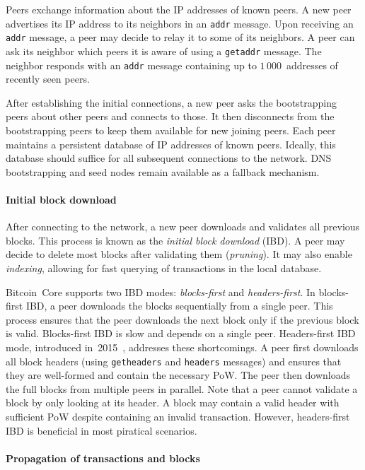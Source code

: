 Peers exchange information about the IP addresses of known peers.
A new peer advertises its IP address to its neighbors in an \texttt{addr} message.
Upon receiving an \texttt{addr} message, a peer may decide to relay it to some of its neighbors.
A peer can ask its neighbor which peers it is aware of using a \texttt{getaddr} message.
The neighbor responds with an \texttt{addr} message containing up to $1\,000$~addresses of recently seen peers.

After establishing the initial connections, a new peer asks the bootstrapping peers about other peers and connects to those.
It then disconnects from the bootstrapping peers to keep them available for new joining peers.
Each peer maintains a persistent database of IP addresses of known peers.
Ideally, this database should suffice for all subsequent connections to the network.
DNS bootstrapping and seed nodes remain available as a fallback mechanism.


\paragraph{Initial block download}

After connecting to the network, a new peer downloads and validates all previous blocks.
This process is known as the \textit{initial block download} (IBD).
A peer may decide to delete most blocks after validating them (\textit{pruning}).
It may also enable \textit{indexing}, allowing for fast querying of transactions in the local database.

Bitcoin~Core supports two IBD modes: \textit{blocks-first} and \textit{headers-first}.
In blocks-first IBD, a peer downloads the blocks sequentially from a single peer.
This process ensures that the peer downloads the next block only if the previous block is valid.
Blocks-first IBD is slow and depends on a single peer.
Headers-first IBD mode, introduced in~2015~\cite{Core2015}, addresses these shortcomings.
A peer first downloads all block headers (using \texttt{getheaders} and \texttt{headers} messages) and ensures that they are well-formed and contain the necessary PoW.
The peer then downloads the full blocks from multiple peers in parallel.
Note that a peer cannot validate a block by only looking at its header.
A block may contain a valid header with sufficient PoW despite containing an invalid transaction.
However, headers-first IBD is beneficial in most piratical scenarios.


\paragraph{Propagation of transactions and blocks}

